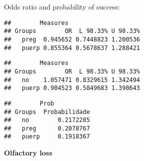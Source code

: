 \documentclass[
]{article}
\newenvironment{Shaded}{\begin{snugshade}}{\end{snugshade}}
\newcommand{\CommentTok}[1]{\textcolor[rgb]{0.56,0.35,0.01}{\textit{#1}}}
\newcommand{\KeywordTok}[1]{\textcolor[rgb]{0.13,0.29,0.53}{\textbf{#1}}}
\newcommand{\NormalTok}[1]{#1}
\newcommand{\OperatorTok}[1]{\textcolor[rgb]{0.81,0.36,0.00}{\textbf{#1}}}
\begin{document}
Odds ratio and probability of success:

\begin{Shaded}
\end{Shaded}

\begin{verbatim}
##        Measures
## Groups        OR  L 98.33% U 98.33%
##   preg  0.945652 0.7448823 1.200536
##   puerp 0.855364 0.5678637 1.288421
\end{verbatim}

\begin{Shaded}
\end{Shaded}

\begin{verbatim}
##        Measures
## Groups        OR  L 98.33% U 98.33%
##   no    1.057471 0.8329615 1.342494
##   puerp 0.904523 0.5849683 1.398643
\end{verbatim}

\begin{Shaded}
\end{Shaded}

\begin{verbatim}
##        Prob
## Groups  Probabilidade
##   no        0.2172285
##   preg      0.2078767
##   puerp     0.1918367
\end{verbatim}

\textbf{Olfactory loss}
\end{document}
